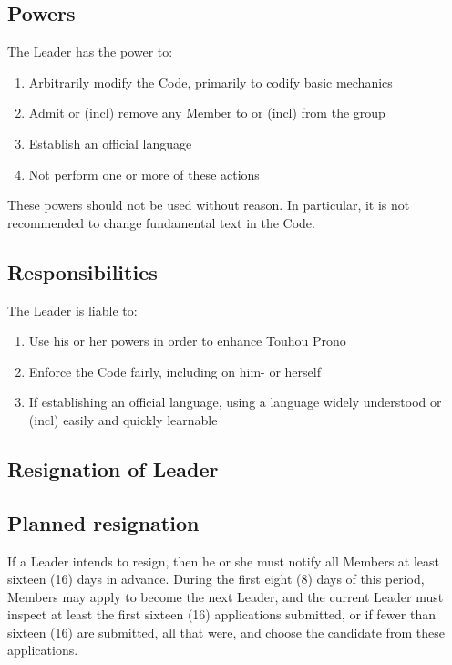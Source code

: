 \documentclass[10pt]{book}
\begin{document}
\subsection{Powers}

The Leader has the power to:

\begin{enumerate}
 \item Arbitrarily modify the Code, primarily to codify basic mechanics
 \item Admit or (incl) remove any Member to or (incl) from the group
 \item Establish an official language
 \item Not perform one or more of these actions
\end{enumerate}

These powers should not be used without reason. In particular, it is not recommended to change fundamental text in the Code.

\subsection{Responsibilities}

The Leader is liable to:

\begin{enumerate}
 \item Use his or her powers in order to enhance Touhou Prono
 \item Enforce the Code fairly, including on him- or herself
 \item If establishing an official language, using a language widely understood or (incl) easily and quickly learnable
\end{enumerate}

\subsection{Resignation of Leader}

\subsection{Planned resignation}

If a Leader intends to resign, then he or she must notify all Members at least sixteen (16) days in advance. During the first eight (8) days of this period, Members may apply to become the next Leader, and the current Leader must inspect at least the first sixteen (16) applications submitted, or if fewer than sixteen (16) are submitted, all that were, and choose the candidate from these applications.
\end{document}
